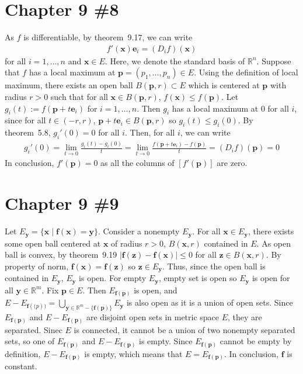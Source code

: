 \documentclass{scrartcl}
\begin{document}
\section{Chapter 9 \#8}
As \(f\) is differentiable, by theorem~9.17, we can write
\begin{align*}
  f'(\mathbf{x}) \mathbf{e}_i
  = (D_i f) (\mathbf{x})
\end{align*}
for all \(i = 1, \dots, n\) and \(\mathbf{x} \in E\). Here, we denote the
standard basis of \(\mathbb{R}^n\). Suppose that \(f\) has a local maximum at
\(\mathbf{p} = (p_1, \dots, p_n) \in E\). Using the definition of local
maximum, there exists an open ball \(B(\mathbf{p}, r) \subset E\) which is
centered at \(\mathbf{p}\) with radius \(r > 0\) such that for all \(\mathbf{x}
\in B(\mathbf{p}, r)\), \(f(\mathbf{x}) \le f(\mathbf{p})\). Let \(g_i(t) :=
f(\mathbf{p} + t\mathbf{e}_i)\) for \(i = 1, \dots, n\). Then \(g_i\) has a
local maximum at 0 for all \(i\), since for all \(t \in (-r, r)\), \(\mathbf{p}
+ t\mathbf{e}_i \in B(\mathbf{p}, r)\) so \(g_i(t) \le g_i(0)\). By
theorem~5.8, \(g_i'(0) = 0\) for all \(i\). Then, for all \(i\), we can write
\begin{align*}
  g_i'(0)
  = \lim_{t \to 0} \frac{g_i(t) - g_i(0)}{t}
  = \lim_{t \to 0} \frac{f(\mathbf{p} + t\mathbf{e}_i) - f(\mathbf{p})}{t}
  = (D_i f)(\mathbf{p}) = 0
\end{align*}
In conclusion, \(f'(\mathbf{p}) = 0\) as all the columns of
\([f'(\mathbf{p})]\) are zero.

\section{Chapter 9 \#9}
Let \(E_\mathbf{y} = \{\mathbf{x}\; |\; \mathbf{f}(\mathbf{x}) =
\mathbf{y}\}\). Consider a nonempty \(E_\mathbf{y}\). For all \(\mathbf{x} \in
E_\mathbf{y}\), there exists some open ball centered at \(\mathbf{x}\) of
radius \(r > 0\), \(B(\mathbf{x}, r)\) contained in \(E\). As open ball is
convex, by theorem~9.19 \(|\mathbf{f}(\mathbf{z}) - \mathbf{f}(\mathbf{x})| \le
0\) for all \(\mathbf{z} \in B(\mathbf{x}, r)\). By property of norm,
\(\mathbf{f}(\mathbf{x}) = \mathbf{f}(\mathbf{z})\) so \(\mathbf{z} \in
E_\mathbf{y}\). Thus, since the open ball is contained in \(E_\mathbf{y}\),
\(E_\mathbf{y}\) is open. For empty \(E_\mathbf{y}\), empty set is open so
\(E_\mathbf{y}\) is open for all \(\mathbf{y} \in \mathbb{R}^m\). Fix
\(\mathbf{p} \in E\). Then \(E_{\mathbf{f}(\mathbf{p})}\) is open, and \(E -
E_{\mathbf{f}(\mathbf(p))} = \bigcup_{\mathbf{y} \in \mathbb{R}^m -
\{\mathbf{f}(\mathbf{p})\}} E_\mathbf{y}\) is also open as it is a union of
open sets. Since \(E_{\mathbf{f}(\mathbf{p})}\) and \(E -
E_{\mathbf{f}(\mathbf{p})}\) are disjoint open sets in metric space \(E\), they
are separated. Sinec \(E\) is connected, it cannot be a union of two nonempty
separated sets, so one of \(E_{\mathbf{f}(\mathbf{p})}\) and \(E -
E_{\mathbf{f}(\mathbf{p})}\) is empty. Since \(E_{\mathbf{f(\mathbf{p})}}\)
cannot be empty by definition, \(E - E_{\mathbf{f}(\mathbf{p})}\) is empty,
which means that \(E = E_{\mathbf{f(\mathbf{p})}}\). In conclusion,
\(\mathbf{f}\) is constant.
\end{document}
